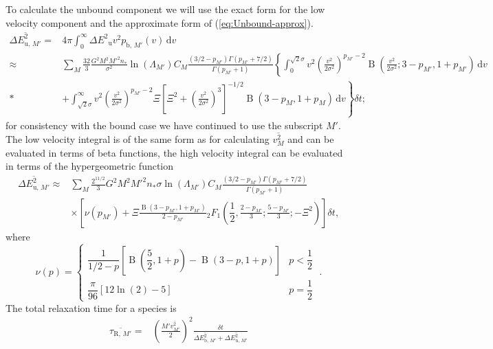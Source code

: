 \documentclass[useAMS,usedcolumn,usegraphicx,usenatbib]{mn2e}
\newcommand{\eqnref}[1]{(\ref{eq:#1})}
\DeclareMathOperator{\Beta}{B}
\newcommand{\sub}[1]{\ensuremath{_\mathrm{#1}}}
\newcommand{\dd}{\ensuremath{\mathrm{d}}}
\newcommand{\intd}[4]{\ensuremath{\displaystyle \int_{#1}^{#2}{#3}\,\dd{#4}}}
\newcommand{\recip}[1]{\ensuremath{\dfrac{1}{#1}}}
\begin{document}
\begin{onecolumn}
To calculate the unbound component we will use the exact form for the low velocity component and the approximate form of \eqnref{Unbound-approx}. 
\begin{align}
\overline{\Delta E^2_{\mathrm{u},\,M'}} = {} & 4\pi\intd{0}{\infty}{\Delta E^2\sub{u} v^2 p_{\mathrm{b},\,M'}(v)}{v} \\
 \approx {} & \sum_M\frac{32}{3}\frac{G^2M^2{M'}^2n_\ast}{\sigma^2}\ln\left(\Lambda_{M'}\right) C_M \frac{(3/2 - p_{M'})\Gamma(p_{M'} + 7/2)}{\Gamma(p_{M'} + 1)} \left\{ \intd{0}{\sqrt{2}\sigma}{v^2\left(\frac{v^2}{2\sigma^2}\right)^{p_{M'}-2}\Beta\left(\frac{v^2}{2\sigma^2};3-p_{M'},1+p_{M'}\right)}{v} \right. \nonumber \\* 
 {} & + \left. \intd{\sqrt{2}\sigma}{\infty}{v^2\left(\frac{v^2}{2\sigma^2}\right)^{p_{M'}-2} \Xi\left[\Xi^2 + \left(\frac{v^2}{2\sigma^2}\right)^3\right]^{-1/2} \Beta\left(3-p_M,1+p_M\right)}{v} \right\} \delta t;
\end{align}
for consistency with the bound case we have continued to use the subscript $M'$. The low velocity integral is of the same form as for calculating $\overline{v^2_M}$ and can be evaluated in terms of beta functions, the high velocity integral can be evaluated in terms of the hypergeometric function~\citep[15.6.1]{Olver2010}
\begin{align}
\overline{\Delta E^2_{\mathrm{u},\,M'}} \approx {} & \sum_M\frac{2^{11/2}}{3}G^2M^2{M'}^2n_\ast\sigma\ln\left(\Lambda_{M'}\right) C_M \frac{(3/2 - p_{M'})\Gamma(p_{M'} + 7/2)}{\Gamma(p_{M'} + 1)} \nonumber \\
  & \times \left[\nu\left(p_{M'}\right) + \Xi\frac{\Beta\left(3-p_{M'},1+p_{M'}\right)}{2-p_{M'}}{_2F_1}\left(\recip{2},\frac{2-p_{M'}}{3};\frac{5-p_{M'}}{3};-\Xi^2\right) \right] \delta t,
\end{align}
where
\begin{equation}
\nu(p) = \begin{cases} \recip{1/2 - p}\left[\Beta\left(\dfrac{5}{2},1+p\right) - \Beta\left(3-p,1+p\right)\right] & p < \recip{2} \\
\dfrac{\pi}{96}\left[12 \ln(2) - 5\right] & p = \recip{2}
\end{cases} \; .
\end{equation}
The total relaxation time for a species is
\begin{align}
\overline{\tau_{\mathrm{R,}\,M'}} = {} & \left(\frac{{M'}\overline{v_{M'}^2}}{2}\right)^2\frac{\delta t}{\overline{\Delta E^2_{\mathrm{b},\,M'}} + \overline{\Delta E^2_{\mathrm{u},\,M'}}} \\

\end{align}
\end{onecolumn}
\end{document}
